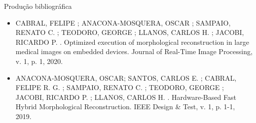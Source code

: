 \documentclass[aspectratio=169]{beamer}
\begin{document}
\begin{frame}{Produção bibliográfica}
	
	
	\begin{itemize}
	\justifying
	
	\item CABRAL, FELIPE ; ANACONA-MOSQUERA, OSCAR ; SAMPAIO, RENATO C. ; TEODORO, GEORGE ; LLANOS, CARLOS H. ; JACOBI, RICARDO P. . Optimized execution of morphological reconstruction in large medical images on embedded devices. Journal of Real-Time Image Processing, v. 1, p. 1, 2020. 			
	
	\item ANACONA-MOSQUERA, OSCAR; SANTOS, CARLOS E. ; CABRAL, FELIPE R. G. ; SAMPAIO, RENATO C. ; TEODORO, GEORGE ; JACOBI, RICARDO P. ; LLANOS, CARLOS H. . Hardware-Based Fast Hybrid Morphological Reconstruction. IEEE Design \& Test, v. 1, p. 1-1, 2019. 
	
	
	
	
	\end{itemize}
	
\end{frame}
\end{document}
